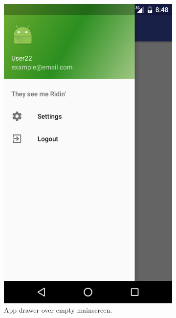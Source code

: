 \begin{figure}[ht!]
\begin{subfigure}[b]{0.24\textwidth}
        \includegraphics[width=\textwidth]{figures/s4test/newusermain.png}
        \caption{App drawer over empty mainscreen.}
        \label{s4tp:numain}
    \end{subfigure}
\begin{subfigure}[b]{0.24\textwidth}

\end{subfigure}
\end{figure}
